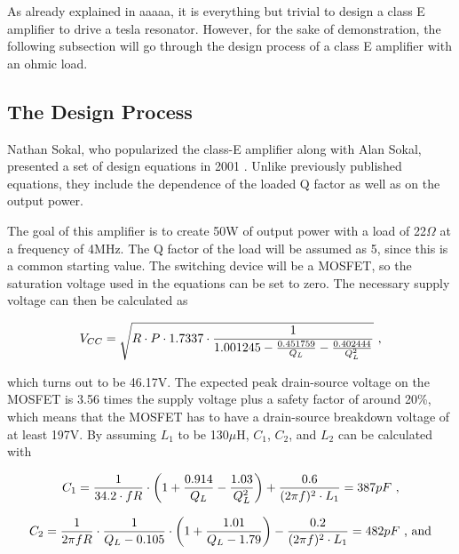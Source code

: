 As already explained in aaaaa, it is everything but trivial to design a class E amplifier to drive a tesla resonator. However, for the sake of demonstration, the following subsection will go through the design process of a class E amplifier with an ohmic load.

\subsection{The Design Process}

Nathan Sokal, who popularized the class-E amplifier along with Alan Sokal, presented a set of design equations in 2001 . Unlike previously published equations, they include the dependence of the loaded Q factor as well as on the output power.

The goal of this amplifier is to create 50W of output power with a load of 22\(\Omega\) at a frequency of 4MHz. The Q factor of the load will be assumed as 5, since this is a common starting value. The switching device will be a MOSFET, so the saturation voltage used in the equations can be set to zero. The necessary supply voltage can then be calculated as

\begin{equation*}
    V_{CC} = \sqrt{R \cdot P \cdot 1.7337 \cdot \frac{1}{1.001245 - \frac{0.451759}{Q_L} - \frac{0.402444}{Q_L^2}}}\textnormal{ ,}
\end{equation*}

which turns out to be 46.17V. The expected peak drain-source voltage on the MOSFET is 3.56 times the supply voltage plus a safety factor of around 20\%, which means that the MOSFET has to have a drain-source breakdown voltage of at least 197V. By assuming \(L_1\) to be 130\(\mu\)H, \(C_1\), \(C_2\), and \(L_2\) can be calculated with

\begin{equation*}
    C_1 = \frac{1}{34.2\cdot f R} \cdot \left( 1 + \frac{0.914}{Q_L} - \frac{1.03}{Q_L^2} \right) + \frac{0.6}{(2 \pi f)^2  \cdot L_1} = 387 pF\textnormal{ ,}
\end{equation*}

\begin{equation*}
    C_2 = \frac{1}{2 \pi  f  R} \cdot \frac{1}{Q_L - 0.105} \cdot \left( 1 + \frac{1.01}{Q_L - 1.79} \right) - \frac{0.2}{(2 \pi f)^2 \cdot L_1} = 482pF \textnormal{ , and}
\end{equation*}

